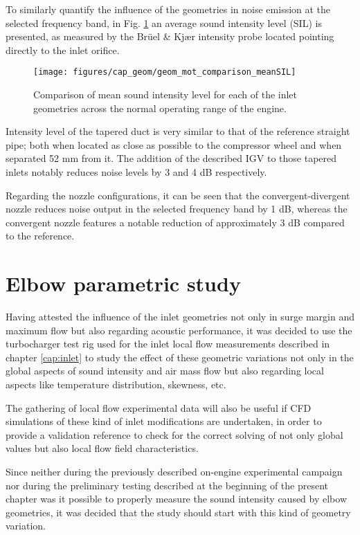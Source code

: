 To similarly quantify the influence of the geometries in noise emission at the selected frequency band, in Fig. \ref{fig:geom_mot_comparison_meanSIL} an average sound intensity level (SIL) is presented, as measured by the Brüel \& Kj\ae r intensity probe located pointing directly to the inlet orifice.

\begin{figure}[htb!]
\centering
\texttt{[image: figures/cap\_geom/geom\_mot\_comparison\_meanSIL]}
\caption{Comparison of mean sound intensity level for each of the inlet geometries across the normal operating range of the engine.}
\label{fig:geom_mot_comparison_meanSIL}
\end{figure}

Intensity level of the tapered duct is very similar to that of the reference straight pipe; both when located as close as possible to the compressor wheel and when separated 52 mm from it. The addition of the described IGV to those tapered inlets notably reduces noise levels by 3 and 4 dB respectively. 

Regarding the nozzle configurations, it can be seen that the convergent-divergent nozzle reduces noise output in the selected frequency band by 1 dB, whereas the convergent nozzle features a notable reduction of approximately 3 dB compared to the reference.

\section{Elbow parametric study}
\label{sec:geom_elbows}

Having attested the influence of the inlet geometries not only in surge margin and maximum flow but also regarding acoustic performance, it was decided to use the turbocharger test rig used for the inlet local flow measurements described in chapter \ref{cap:inlet} to study the effect of these geometric variations not only in the global aspects of sound intensity and air mass flow but also regarding local aspects like temperature distribution, skewness, etc.

The gathering of local flow experimental data will also be useful if CFD simulations of these kind of inlet modifications are undertaken, in order to provide a validation reference to check for the correct solving of not only global values but also local flow field characteristics.

Since neither during the previously described on-engine experimental campaign nor during the preliminary testing described at the beginning of the present chapter was it possible to properly measure the sound intensity caused by elbow geometries, it was decided that the study should start with this kind of geometry variation.

